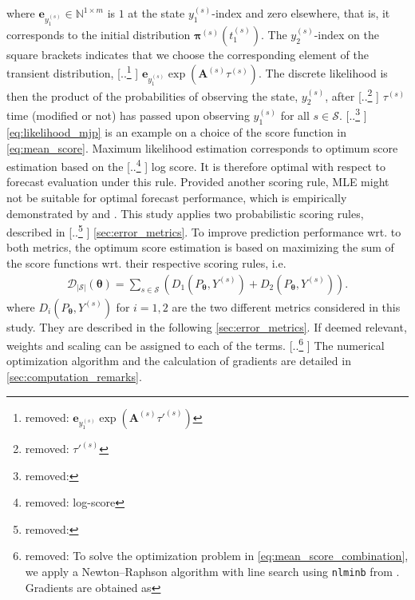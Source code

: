 \documentclass{article}
\providecommand{\DIFadd}[1]{{\protect\color{blue} \sf #1}} %
\providecommand{\DIFdel}[1]{{\protect\color{red} [..\footnote{removed: #1} ]}} %
\providecommand{\DIFaddbegin}{} %
\providecommand{\DIFaddend}{} %
\providecommand{\DIFdelbegin}{} %
\providecommand{\DIFdelend}{} %
\begin{document}
where $\bm{e}_{y_{1}^{(s)}} \in \mathbb{N}^{1 \times m}$ is $1$ at the state $y_{1}^{(s)}$-index and zero elsewhere, that is, it corresponds to the initial distribution $\bm{\pi}^{(s)}(t_1^{(s)})$. The $y_2^{(s)}$-index on the square brackets indicates that we choose the corresponding element of the transient distribution, \DIFdelbegin \DIFdel{$\bm{e}_{y_{1}^{(s)}}  \exp \left( \bm{A}^{(s)} \tau'^{(s)} \right)$}\DIFdelend \DIFaddbegin \DIFadd{$\bm{e}_{y_{1}^{(s)}}  \exp \left( \bm{A}^{(s)} \tau^{(s)} \right)$}\DIFaddend . 
The discrete likelihood is then the product of the probabilities of observing the state, $y_2^{(s)}$, after \DIFdelbegin \DIFdel{$\tau'^{(s)}$ }\DIFdelend \DIFaddbegin \DIFadd{$\tau^{(s)}$ }\DIFaddend time (modified or not) has passed upon observing $y_1^{(s)}$ for all $s \in \mathcal{S}$.
\DIFdelbegin \DIFdel{ }\DIFdelend \DIFaddbegin \DIFadd{\cref{eq:likelihood_mjp} }\DIFaddend is an example on a choice of the score function in \cref{eq:mean_score}.
Maximum likelihood estimation corresponds to optimum score estimation based on the \DIFdelbegin \DIFdel{log-score}\DIFdelend \DIFaddbegin \DIFadd{log score}\DIFaddend . It is therefore optimal with respect to forecast evaluation under this rule. Provided another scoring rule, MLE might not be suitable for optimal forecast performance, which is empirically demonstrated by \citet{Gneiting2005} and \citet{gebetsberger2018a}.
This study applies two probabilistic scoring rules, described in \DIFdelbegin \DIFdel{}\DIFdelend \DIFaddbegin \DIFadd{\cref{sec:error_metrics}}\DIFaddend . To improve prediction performance wrt. to both metrics, the optimum score estimation is based on maximizing the sum of the score functions wrt. their respective scoring rules, i.e.
\begin{align}
     \mathcal{D}_{{|\mathcal{S}|}}(\bm{\theta}) = \sum_{s \in \mathcal{S}} \left( D_1\left(P_{\bm{\theta}}, Y^{(s)}\right) + D_2\left(P_{\bm{\theta}}, Y^{(s)}\right) \right). \label{eq:mean_score_combination}
\end{align}
where $D_i(P_{\bm{\theta}}, Y^{(s)})$ for $i = 1,2$ are the two different metrics considered in this study. They are described in the following \cref{sec:error_metrics}. If deemed relevant, weights and scaling can be assigned to each of the terms. 
\DIFdelbegin \DIFdel{To solve the optimization problem in \cref{eq:mean_score_combination}, we apply a Newton–Raphson algorithm with line search using \texttt{nlminb} from \citet{R_stats}. Gradients are obtained as }\DIFdelend \DIFaddbegin \DIFadd{The numerical optimization algorithm and the calculation of gradients are }\DIFaddend detailed in \cref{sec:computation_remarks}.
\end{document}
